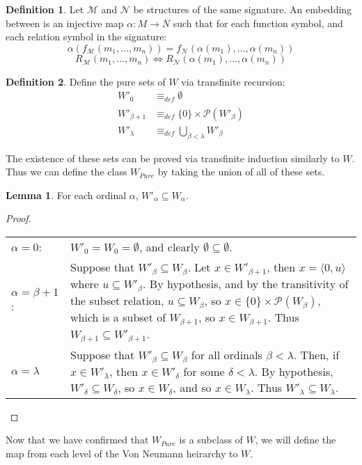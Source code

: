 \documentclass[11pt]{article}
\newcommand{\eqdef}{\equiv_\mathit{def}}
\newcommand{\pair}[2]{\langle #1,#2 \rangle}
\theoremstyle{definition}
\theoremstyle{theorem}
\theoremstyle{lemma}
\newtheorem{definition}{Definition}[section]
\newtheorem{lemma}[theorem]{Lemma}
\begin{document}
\begin{definition}\label{embedding}
Let $\mathcal{M}$ and $\mathcal{N}$ be structures of the same signature. An embedding between is an injective map $\alpha:M\to N$ such that for each function symbol, and each relation symbol in the signature:
 $$\alpha(f_{\mathcal{M}}(m_1,\ldots,m_n)) = f_{\mathcal{N}}(\alpha(m_1),\ldots,\alpha(m_n))$$
 $$R_\mathcal{M}(m_1,\ldots,m_n) \iff R_\mathcal{N}(\alpha(m_1),\ldots,\alpha(m_n))$$
\end{definition}

\begin{definition}
Define the pure sets of $W$ via transfinite recursion:
\begin{align*}
W'_0 &\eqdef \emptyset\\
W'_{\beta+1} &\eqdef \{0\}\times\mathcal{P}(W'_\beta) \\
W'_\lambda &\eqdef \bigcup_{\beta < \lambda} W'_\beta
\end{align*}
\end{definition}
\noindent
The existence of these sets can be proved via transfinite induction similarly to $W$. Thus we can define the class $W_{\mathit{Pure}}$ by taking the union of all of these sets.
\begin{lemma} For each ordinal $\alpha$, $W'_\alpha \subseteq W_\alpha$.
  \begin{proof} \hspace\\
    \begin{tabular}{p{20mm} p{10cm}}
      $\alpha = 0$: \rule{0pt}{4ex} &
      $W'_0 = W_0 = \emptyset$, and clearly $\emptyset \subseteq \emptyset$. \\
      $\alpha = \beta+1$: \rule{0pt}{4ex} &
      Suppose that $W'_\beta \subseteq W_\beta$. Let $x\in W'_{\beta+1}$, then $x = \pair{0}{u}$ where $u \subseteq W'_\beta$. By hypothesis, and by the transitivity of the subset relation, $u\subseteq W_\beta$, so $x\in\{0\}\times\mathcal{P}(W_\beta)$, which is a subset of $W_{\beta+1}$, so $x\in W_{\beta+1}$. Thus $W_{\beta+1} \subseteq W'_{\beta+1}$.
      \\
      $\alpha = \lambda$ \rule{0pt}{4ex} &
      Suppose that $W'_{\beta} \subseteq W_{\beta}$ for all ordinals $\beta < \lambda$. Then, if $x\in W'_\lambda$, then $x\in W'_\delta$ for some $\delta < \lambda$. By hypothesis, $W'_\delta \subseteq W_\delta$, so $x\in W_\delta$, and so $x\in W_\lambda$. Thus $W'_\lambda\subseteq W_\lambda$.
    \end{tabular}
  \end{proof}
\end{lemma}
\noindent
Now that we have confirmed that $W_{\mathit{Pure}}$ is a subclass of $W$, we will define the map from each level of the Von Neumann heirarchy to $W$.
\end{document}
